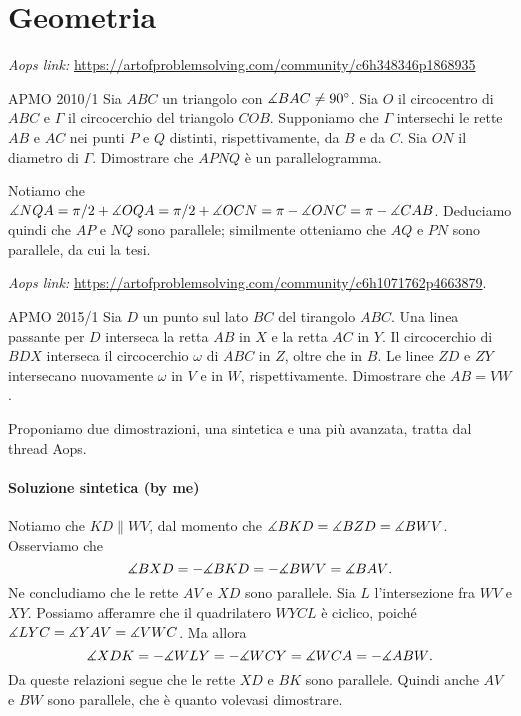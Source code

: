 \documentclass{article}
\begin{document}
\pagestyle{fancy}
\fancyhf{}
\fancyhead[R]{\nouppercase{\leftmark}}


\section{Geometria}

\textit{Aops link:}
\href{https://artofproblemsolving.com/community/c6h348346p1868935}
{https://artofproblemsolving.com/community/c6h348346p1868935}

\begin{proposition}{APMO 2010/1}{}
	Sia $ABC$ un triangolo con $\measuredangle{BAC}\ne 90^{\circ}$. Sia $O$ il
	circocentro di $ABC$ e $\Gamma$ il circocerchio del triangolo $COB$.
	Supponiamo che $\Gamma$ intersechi le rette $AB$ e $AC$ nei punti $P$ e $Q$
	distinti, rispettivamente, da $B$ e da $C$. Sia $ON$ il diametro di $\Gamma$.
	Dimostrare che $APNQ$ è un parallelogramma.
\end{proposition}

Notiamo che $\measuredangle{NQA}=\pi /2 + \measuredangle{OQA}=\pi /2+\measuredangle{OCN}=
\pi-\measuredangle{ONC}=\pi-\measuredangle{CAB}$. Deduciamo quindi che $AP$ e $NQ$ sono parallele;
similmente otteniamo che $AQ$ e $PN$ sono parallele, da cui la tesi.

\vspace{0.5cm}
\textit{Aops link:}
\href{https://artofproblemsolving.com/community/c6h1071762p4663879}
{https://artofproblemsolving.com/community/c6h1071762p4663879}.

\begin{proposition}{APMO 2015/1}{}
	Sia $D$ un punto sul lato $BC$ del tirangolo $ABC$.
	Una linea passante per $D$ interseca la retta $AB$ in $X$
	e la retta $AC$ in $Y$.
	Il circocerchio di $BDX$ interseca il circocerchio $\omega$ di $ABC$ in $Z$,
	oltre che in $B$. Le linee $ZD$ e $ZY$ intersecano nuovamente $\omega$ in $V$
	e in $W$, rispettivamente. Dimostrare che $AB=VW$.
\end{proposition}

Proponiamo due dimostrazioni, una sintetica e una più avanzata,
tratta dal thread Aops.

\paragraph{Soluzione sintetica (by me)}
Notiamo che $KD\parallel WV$, dal momento che $\measuredangle{BKD}=\measuredangle{BZD}=\measuredangle{BWV}$.
Osserviamo che
\begin{equation*}
	\measuredangle{BXD}=-\measuredangle{BKD}=-\measuredangle{BWV}=\measuredangle{BAV}.
\end{equation*}
Ne concludiamo che le rette $AV$ e $XD$ sono parallele.
Sia $L$ l'intersezione fra $WV$ e $XY$. Possiamo afferamre che il quadrilatero
$WYCL$ è ciclico, poiché $\measuredangle{LYC}=\measuredangle{YAV}=\measuredangle{VWC}$.
Ma allora
\begin{equation*}
	\measuredangle{XDK}=-\measuredangle{WLY}=-\measuredangle{WCY}=\measuredangle{WCA}=-\measuredangle{ABW}.
\end{equation*}
Da queste relazioni segue che le rette $XD$ e $BK$ sono parallele.
Quindi anche $AV$ e $BW$ sono parallele, che è quanto volevasi dimostrare.
\end{document}
